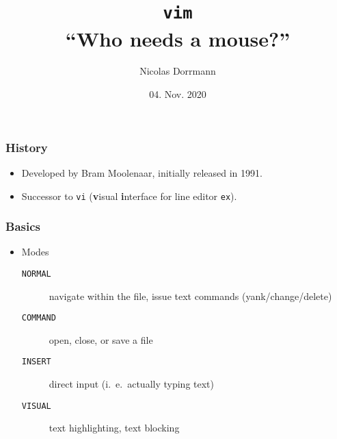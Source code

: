 \documentclass{beamer}
\title{\texttt{vim} \\ ``Who needs a mouse?''}
\author{Nicolas Dorrmann}
\date{04. Nov. 2020}
\begin{document}
\frame{\titlepage}

\begin{frame}
    \frametitle{History}
    \begin{itemize}
        \item Developed by Bram Moolenaar, initially released in 1991.
        \item Successor to \texttt{vi} (\textbf{v}isual \textbf{i}nterface for line editor \texttt{ex}).
    \end{itemize}
\end{frame}
\begin{frame}
    \frametitle{Basics}
    \begin{itemize}
        \item Modes
            \begin{description}
                \item [\texttt{NORMAL}]  navigate within the file, issue text commands (yank/change/delete)
                \item [\texttt{COMMAND}] open, close, or save a file
                \item [\texttt{INSERT}]  direct input (i.\ e.\ actually typing text)
                \item [\texttt{VISUAL}]  text highlighting, text blocking
            \end{description}
    \end{itemize}
\end{frame}
\end{document}
